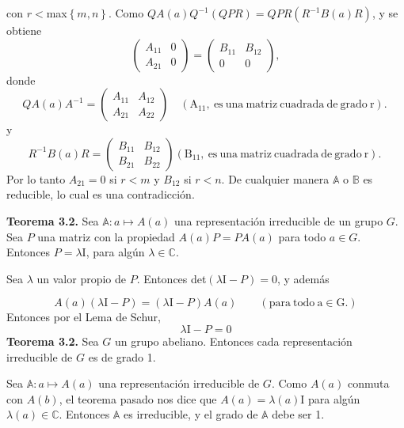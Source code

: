 \documentclass[12pt]{book}
\theoremstyle{definition}
\newcounter{in}
\begin{document}
con $r<$max$\left\{ m,n \right\}$. Como $QA(a)Q^{-1}(QPR) = QPR(R^{-1}B(a)R)$, y se obtiene
\begin{equation*}
  \begin{pmatrix}
    A_{11} & 0 \\ 
    A_{21} & 0
  \end{pmatrix}
  =
  \begin{pmatrix}
    B_{11} & B_{12} \\ 
    0 & 0
  \end{pmatrix},
\end{equation*}
donde
\begin{equation*}
  QA(a)A^{-1}=
  \begin{pmatrix}
    A_{11} & A_{12} \\ 
    A_{21} & A_{22}
  \end{pmatrix} \quad \mathrm{(A_{11},\ es\ una\ matriz\ cuadrada\ de\ grado\ r).\ }
\end{equation*}  
y
\begin{equation*}
  R^{-1}B(a)R=
  \begin{pmatrix}
    B_{11} & B_{12} \\ 
    B_{21} & B_{22}
  \end{pmatrix} \mathrm{(B_{11},\ es\ una\ matriz\ cuadrada\ de\ grado\ r).\ }
\end{equation*}  
Por lo tanto $A_{21}=0$ si $r<m$ y $B_{12}$ si $r<n$. De cualquier
manera $\mathbb{A}$ o $\mathbb{B}$ es reducible, lo cual es una
contradicción.

\textbf{Teorema 3.2.} Sea
$\mathbb{A} \colon a \mapsto A\left(a\right)$ una representación
irreducible de un grupo $G$. Sea $P$ una matriz con la propiedad
$A(a)P=PA(a)$ para todo $a \in G$. Entonces $P=\lambda \mathrm{I}$,
para algún $\lambda \in \mathbb{C}$.

Sea $\lambda$ un valor propio de $P$. Entonces
det$(\lambda \mathrm{I} - P)=0$, y además

\begin{equation*}
  A(a)(\lambda \mathrm{I} - P)=(\lambda \mathrm{I} - P)A(a) \qquad \mathrm{(para\ todo\ a \in G.)}
\end{equation*}
Entonces por el Lema de Schur,
\begin{equation*}
  \lambda \mathrm{I}-P=0
\end{equation*}
\textbf{Teorema 3.2.} Sea $G$ un grupo abeliano. Entonces cada
representación irreducible de $G$ es de grado 1.

Sea $\mathbb{A}\colon a \mapsto A\left(a\right)$ una representación
irreducible de $G$. Como $A(a)$ conmuta con $A(b)$, el teorema pasado
nos dice que $A(a)=\lambda(a) \mathrm{I}$ para algún
$\lambda(a) \in \mathbb{C}$. Entonces $\mathbb{A}$ es irreducible, y
el grado de $\mathbb{A}$ debe ser 1.
\end{document}
